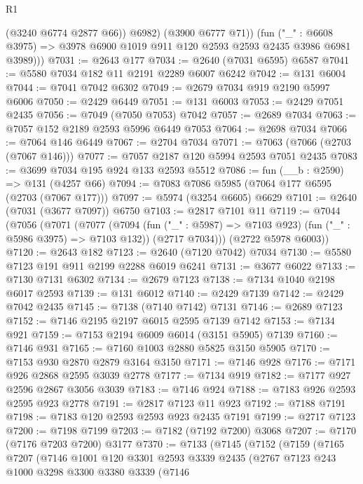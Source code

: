 \begin{lexlean}{R1}
\begin{coremodule}
              (@3240 @6774 @2877 @66))
            @6982)
          (@3900 @6777 @71))
        (fun ("_" : @6608 @3975) =>
        @3978 @6900 @1019 @911 @120 @2593 @2593 @2435 @3986 @6981 @3989)))
@7031 := @2643 @177
@7034 := @2640 (@7031 @6595) @6587
@7041 := @5580 @7034 @182 @11 @2191 @2289 @6007 @6242
@7042 := @131 @6004
@7044 := @7041 @7042 @6302
@7049 := @2679 @7034 @919 @2190 @5997 @6006
@7050 := @2429 @6449
@7051 := @131 @6003
@7053 := @2429 @7051 @2435
@7056 := @7049 (@7050 @7053) @7042
@7057 := @2689 @7034
@7063 := @7057 @152 @2189 @2593 @5996 @6449 @7053
@7064 := @2698 @7034
@7066 := @7064 @146 @6449
@7067 := @2704 @7034
@7071 := @7063 (@7066 (@2703 (@7067 @146)))
@7077 := @7057 @2187 @120 @5994 @2593 @7051 @2435
@7083 := @3699 @7034 @195 @924 @133 @2593 @5512
@7086 := fun (__b : @2590) => @131 (@4257 @66)
@7094 := @7083 @7086 @5985 (@7064 @177 @6595 (@2703 (@7067 @177)))
@7097 := @5974 (@3254 @6605) @6629
@7101 := @2640 (@7031 (@3677 @7097)) @6750
@7103 := @2817 @7101 @11
@7119 := @7044
    (@7056
      (@7071
        (@7077
          (@7094 (fun ("_" : @5987) => @7103 @923) (fun ("_" : @5986 @3975) => @7103 @132))
          (@2717 @7034)))
      (@2722 @5978 @6003))
@7120 := @2643 @182
@7123 := @2640 (@7120 @7042) @7034
@7130 := @5580 @7123 @191 @911 @2199 @2288 @6019 @6241
@7131 := @3677 @6022
@7133 := @7130 @7131 @6302
@7134 := @2679 @7123
@7138 := @7134 @1040 @2198 @6017 @2593
@7139 := @131 @6012
@7140 := @2429 @7139
@7142 := @2429 @7042 @2435
@7145 := @7138 (@7140 @7142) @7131
@7146 := @2689 @7123
@7152 := @7146 @2195 @2197 @6015 @2595 @7139 @7142
@7153 := @7134 @921
@7159 := @7153 @2194 @6009 @6014 (@3151 @5905) @7139
@7160 := @7146 @931
@7165 := @7160 @1003 @2880 @5825 @3150 @5905
@7170 := @7153 @930 @2870 @2879 @3164 @3150
@7171 := @7146 @928
@7176 := @7171 @926 @2868 @2595 @3039 @2778
@7177 := @7134 @919
@7182 := @7177 @927 @2596 @2867 @3056 @3039
@7183 := @7146 @924
@7188 := @7183 @926 @2593 @2595 @923 @2778
@7191 := @2817 @7123 @11 @923
@7192 := @7188 @7191
@7198 := @7183 @120 @2593 @2593 @923 @2435 @7191
@7199 := @2717 @7123
@7200 := @7198 @7199
@7203 := @7182 (@7192 @7200) @3068
@7207 := @7170 (@7176 @7203 @7200) @3177
@7370 := @7133
    (@7145
      (@7152
        (@7159
          (@7165
            @7207
            (@7146
              @1001
              @120
              @3301
              @2593
              @3339
              @2435
              (@2767
                @7123
                @243
                @1000
                @3298
                @3300
                @3380
                @3339
                (@7146

\end{coremodule}
\end{lexlean}
